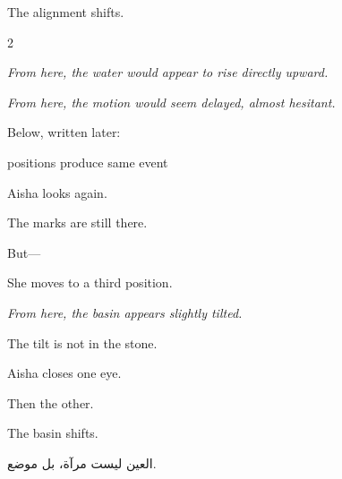 The alignment shifts.

\medskip

\begin{multicols}{2}

\textit{From here, the water would appear to rise directly upward.}

\columnbreak

\textit{From here, the motion would seem delayed, almost hesitant.}

\end{multicols}

\medskip

Below, written later:

\medskip

\begin{center}
 positions produce  same event
\end{center}

\medskip

Aisha looks again.

\medskip

The marks are still there.

But---

\medskip


\medskip

She moves to a third position.

\medskip

\textit{From here, the basin appears slightly tilted.}

\medskip

The tilt is not in the stone.

\medskip


\medskip

Aisha closes one eye.

Then the other.

\medskip

The basin shifts.

\medskip

\begin{AR}
العين ليست مرآة، بل موضع.
\end{AR}

\medskip

